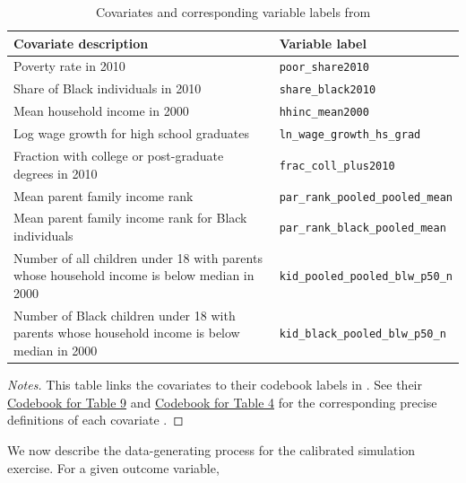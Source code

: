 \documentclass[12pt, reqno]{amsart}
\numberwithin{equation}{section}
\begin{document}
\begin{refsection}
\begin{appendices}
\begin{table}[tb]
  \caption{Covariates and corresponding variable labels from \citet{chetty2018opportunity}}
  \label{fn:covariates}
  \centering
\scriptsize
\begin{tabularx}{\textwidth}{YY}
\toprule
\textbf{Covariate description} & \textbf{Variable label} \\ \midrule
Poverty rate in 2010 & \texttt{poor\_share2010} \\ \hline
Share of Black individuals in 2010 & \texttt{share\_black2010} \\ \hline
Mean household income in 2000 & \texttt{hhinc\_mean2000} \\ \hline
Log wage growth for high school graduates & \texttt{ln\_wage\_growth\_hs\_grad} \\ \hline
Fraction with college or post-graduate degrees in 2010 & \texttt{frac\_coll\_plus2010} \\ \hline
Mean parent family income rank & \texttt{par\_rank\_pooled\_pooled\_mean} \\ \hline
Mean parent family income rank for Black individuals & \texttt{par\_rank\_black\_pooled\_mean} \\ \hline
Number of all children under 18 with parents whose household income is below median in
2000 & \texttt{kid\_pooled\_pooled\_blw\_p50\_n} \\ \hline
Number of Black children under 18 with parents whose household income is below median in
2000 & \texttt{kid\_black\_pooled\_blw\_p50\_n} \\ \bottomrule
\end{tabularx}

\begin{proof}[Notes]
This table links the covariates to their codebook labels in \citet{chetty2018opportunity}.
See their
\href{https://opportunityinsights.org/wp-content/uploads/2019/07/Codebook-for-Table-9.pdf}
 {Codebook for Table 9} and 
\href{https://opportunityinsights.org/wp-content/uploads/2019/07/Codebook-for-Table-4.pdf}
 {Codebook for Table 4} for the corresponding precise definitions of each covariate
 \citep{opportunity_insights_data}.
\end{proof}

\end{table}





We now describe the data-generating process for the calibrated simulation exercise. For a
given outcome variable,


\end{appendices}
\end{refsection}
\end{document}
